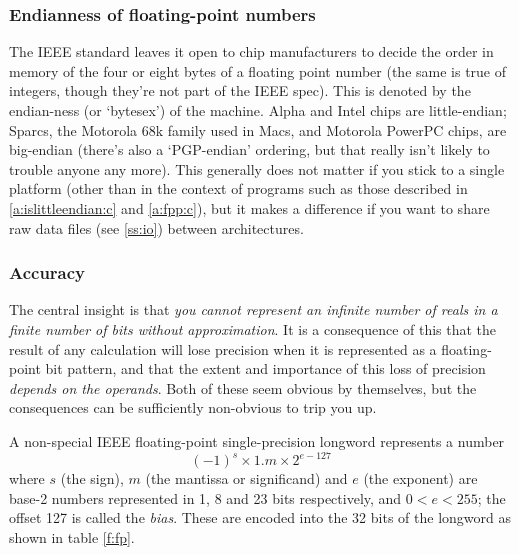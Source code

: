 \documentclass[11pt,oneside,chapters]{starlink}
\begin{document}
\subsubsection{Endianness of floating-point numbers}
\label{s:endianness}


The IEEE standard leaves it open to chip manufacturers
to decide the order in memory of the four or eight bytes
of a floating point number (the same is true of
integers, though they're not part of the IEEE spec).
This is denoted by the endian-ness (or `bytesex') of the
machine.  Alpha and Intel chips are little-endian;
Sparcs, the Motorola 68k family used in Macs, and
Motorola PowerPC chips, are big-endian (there's also a
`PGP-endian' ordering, but that really isn't likely to
trouble anyone any more).  This generally does not
matter if you stick to a single platform (other than in
the context of programs such as those described in \ref{a:islittleendian:c}
and \ref{a:fpp:c}), but
it makes a difference if you want to share raw data
files (see \ref{ss:io}) between architectures.


\subsubsection{Accuracy}
\label{s:accuracy}


The central insight is that \emph{you cannot represent an
infinite number of reals in a finite number of bits
without approximation}.  It is a consequence of
this that the result of any calculation will lose
precision when it is represented as a floating-point
bit pattern, and that the extent and importance of
this loss of precision \emph{depends on the
operands}.  Both of these seem obvious by
themselves, but the consequences can be sufficiently
non-obvious to trip you up.

A non-special IEEE floating-point single-precision
longword represents a number
\begin{equation}
(-1)^s \times 1.m \times 2^{e-127}
\label{e:ieee1}
\end{equation}
where $s$ (the sign),
$m$ (the mantissa or significand) and $e$ (the
exponent) are base-2 numbers represented in 1, 8 and 23
bits respectively, and $0 < e < 255$; the offset 127 is called the
\emph{bias}.  These are encoded into the 32 bits of
the longword as shown in table \ref{f:fp}.
\end{document}
